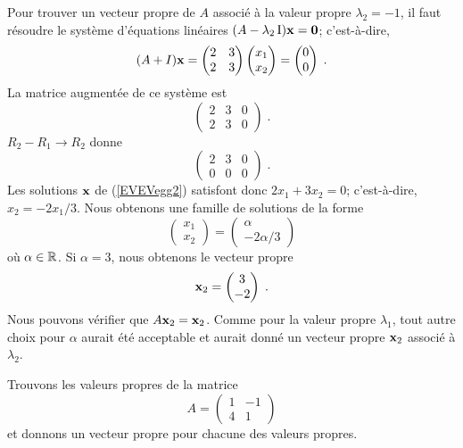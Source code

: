 {\begin{egg}
Pour trouver un vecteur propre de $A$ associé à la valeur propre
$\lambda_2=-1$, il faut résoudre le système d'équations linéaires
$(A -\lambda_2 \operatorname{I}) \mathbf{x} = \mathbf{0}$; c'est-à-dire,
\begin{equation}\label{EVEVegg2}
(A + I) \mathbf{x} =
\begin{pmatrix}
2 & 3 \\ 2 & 3
\end{pmatrix}
\begin{pmatrix}
x_1 \\ x_2
\end{pmatrix}
=
\begin{pmatrix}
0 \\ 0
\end{pmatrix} \; .
\end{equation}
La matrice augmentée de ce système est
\[
\left(\begin{array}{rr|r}
2 & 3 & 0 \\
2 & 3 & 0
\end{array}\right) \; .
\]
$R_2 -  R_1 \to R_2$ donne
\[
\left(\begin{array}{rr|r}
2 & 3 & 0 \\
0 & 0 & 0
\end{array}\right) \; .
\]
Les solutions $\mathbf{x}$ de (\ref{EVEVegg2}) satisfont donc
$2x_1 +3x_2 = 0$;  c'est-à-dire, $x_2= -2x_1 /3$.  Nous obtenons une
famille de solutions de la forme
\[
\begin{pmatrix}
x_1 \\ x_2
\end{pmatrix}
=
\begin{pmatrix}
\alpha \\ -2 \alpha /3
\end{pmatrix}
\]
où $\alpha \in \mathbb{R}$.  Si $\alpha = 3$, nous obtenons le vecteur propre
\[
\mathbf{x}_2 =
\begin{pmatrix}
3 \\ -2
\end{pmatrix} \; .
\]
Nous pouvons vérifier que $A\mathbf{x}_2 = \mathbf{x}_2$.  Comme pour
la valeur propre $\lambda_1$, tout autre choix pour $\alpha$ aurait
été acceptable et aurait donné un vecteur propre $\mathbf{x}_2$ associé à
$\lambda_2$.
\end{egg}

\begin{egg}
Trouvons les valeurs propres de la matrice
\[
A = \begin{pmatrix} 1 & -1 \\ 4 & 1 \end{pmatrix}
\]
et donnons un vecteur propre pour chacune des valeurs propres.


\end{egg}}
